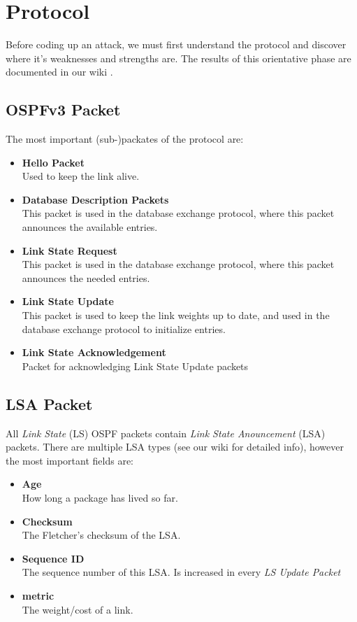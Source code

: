 \documentclass[11pt,a4paper,oneside]{article}
\newcommand{\lsection}[2]{\section{#1}\label{sec:#2}}
\newcommand{\lsubsection}[2]{\subsection{#1}\label{sec:#2}}
\begin{document}
	
    \lsection{Protocol}{protocol}
    		Before coding up an attack, we must first understand the protocol and discover where it's weaknesses and strengths are. The results of this orientative phase are documented in our wiki \cite{wiki}.\\
    		\lsubsection{OSPFv3 Packet}{ospfv3_packet}
			The most important (sub-)packates of the protocol are:
			\begin{itemize}
				\item \textbf{Hello Packet}\\
					Used to keep the link alive.
				\item \textbf{Database Description Packets}\\
					This packet is used in the database exchange protocol, where this packet announces the available entries.
				\item \textbf{Link State Request}\\
					This packet is used in the database exchange protocol, where this packet announces the needed entries.
				\item \textbf{Link State Update}\\
					This packet is used to keep the link weights up to date, and used in the database exchange protocol to initialize entries.
				\item \textbf{Link State Acknowledgement}\\
					Packet for acknowledging Link State Update packets
			\end{itemize}
		\lsubsection{LSA Packet}{lsa_packet}
			All \textit{Link State} (LS) OSPF packets contain \textit{Link State Anouncement} (LSA) packets. There are multiple LSA types (see our wiki\cite{wiki} for detailed info), however the most important fields are:
			\begin{itemize}
				\item \textbf{Age}\\
					How long a package has lived so far.
				\item \textbf{Checksum}\\
					The Fletcher's checksum\cite{fletcher} of the LSA.
				\item \textbf{Sequence ID}\\
					The sequence number of this LSA. Is increased in every \textit{LS Update Packet}
				\item \textbf{metric}\\
					The weight/cost of a link.
			\end{itemize}
			
\end{document}
